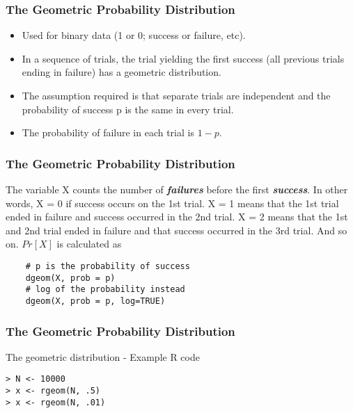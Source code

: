 \documentclass[MAIN.tex]{subfiles}
\begin{document}
 
\begin{frame}[fragile]
	\frametitle{The Geometric Probability Distribution}
	\large
	\begin{itemize}
\item	Used for binary data (1 or 0; success or failure, etc). 
\item In a sequence of trials, the trial yielding the first success (all previous trials ending in failure) has a geometric distribution. 
\item The assumption required is that separate trials are independent and the probability of success p is the same in every trial. 
\item The probability of failure in each trial is $1 - p$.
	\end{itemize}

\end{frame}
\begin{frame}[fragile]
	\frametitle{The Geometric Probability Distribution}
	The variable X counts the number of \textbf{\textit{failures}} before the first \textbf{\textit{success}}. In other words, X = 0 if success occurs on the 1st trial. X = 1 means that the 1st trial ended in failure and success occurred in the 2nd trial. X = 2 means that the 1st and 2nd trial ended in failure and that success occurred in the 3rd trial. And so on. $Pr[X]$ is calculated as
\begin{framed}
	\begin{verbatim}
	# p is the probability of success
	dgeom(X, prob = p)            
	# log of the probability instead
	dgeom(X, prob = p, log=TRUE)  
	\end{verbatim}
\end{framed}
\end{frame}
\begin{frame}[fragile]
\frametitle{The Geometric Probability Distribution}

The geometric distribution - Example R code
\begin{framed}
	\begin{verbatim}
> N <- 10000
> x <- rgeom(N, .5)
> x <- rgeom(N, .01)
	\end{verbatim}
\end{framed}
\end{frame}
\end{document}
